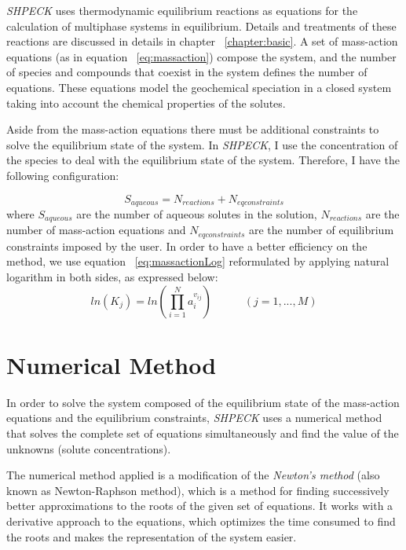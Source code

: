 \emph{SHPECK} uses thermodynamic equilibrium reactions as equations for the calculation of multiphase systems in equilibrium. Details and treatments of these reactions are discussed in details in chapter ~\ref{chapter:basic}. A set of mass-action equations (as in equation ~\ref{eq:massaction}) compose the system, and the number of species and compounds that coexist in the system defines the number of equations. These equations model the geochemical speciation in a closed system taking into account the chemical properties of the solutes.

Aside from the mass-action equations there must be additional constraints to solve the equilibrium state of the system. In \emph{SHPECK}, I use the concentration of the species to deal with the equilibrium state of the system. Therefore, I have the following configuration:

\begin{equation}\label{eq:configuration}
S_{aqueous} = N_{reactions} + N_{eq constraints}
\end{equation}
where $S_{aqueous}$ are the number of aqueous solutes in the solution, $N_{reactions}$ are the number of mass-action equations and $N_{eq constraints}$ are the number of equilibrium constraints imposed by the user. 
In order to have a better efficiency on the method, we use equation ~\ref{eq:massactionLog} reformulated by applying natural logarithm in both sides, as expressed below:
\begin{equation}\label{eq:massactionLog}
ln({K_j}) =  ln({\prod\limits_{i=1}^N  a_i^{v_{ij}}}) \hspace{35pt}    (j = 1, ... , M)
\end{equation}

\section{Numerical Method}
In order to solve the system composed of the equilibrium state of the mass-action equations and the equilibrium constraints, \emph{SHPECK} uses a numerical method that solves the complete set of equations simultaneously and find the value of the unknowns (solute concentrations).


The numerical method applied is a modification of the \emph{Newton's method} (also known as Newton-Raphson method), which is a method for finding successively better approximations to the roots of the given set of equations. It works with a derivative approach to the equations, which optimizes the time consumed to find the roots and makes the representation of the system easier.

